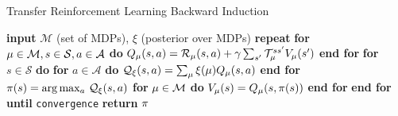 \iffalse
\begin{algorithm}[H]
\caption{Transfer Reinforcement Learning Backward Induction}\label{alg:trl}
\begin{algorithmic}
\State 
{}
\State \hspace{0.5cm}\textbf{input} $\mathcal{M}$ (set of MDPs), $\xi$ (posterior over MDPs)
\State \hspace{0.5cm}\textbf{repeat}
\State \hspace{1.0cm} \textbf{for} $\mu \in \mathcal{M}, s \in \mathcal{S}, a \in \mathcal{A}$ \textbf{do}
\State \hspace{1.5cm} $Q_\mu(s,a) = \mathcal{R}_\mu(s, a) + \gamma \sum_{s'} \mathcal{T}_\mu^{ss'}V_\mu(s')$
\State \hspace{1.0cm} \textbf{end for}
\State \hspace{1.0cm} \textbf{for} $s \in \mathcal{S}$ \textbf{do}
\State \hspace{1.5cm} \textbf{for} $a \in \mathcal{A}$ \textbf{do}
\State \hspace{2.0cm} $\mathcal{Q}_\xi(s, a) = \sum_\mu \xi(\mu)Q_\mu(s, a)$
\State \hspace{1.5cm} \textbf{end for}
\State \hspace{1.5cm} $\pi(s) = \arg\max_a \, \mathcal{Q}_\xi(s,a)$
\State \hspace{1.5cm} \textbf{for} $\mu \in \mathcal{M}$ \textbf{do}
\State \hspace{2.0cm} $V_\mu(s) = Q_\mu(s, \pi(s))$
\State \hspace{1.5cm} \textbf{end for}
\State \hspace{1.0cm} \textbf{end for}
\State \hspace{0.5cm} \textbf{until} \texttt{convergence}
\State \hspace{0.5cm} \textbf{return} $\pi$


\end{algorithmic}
\end{algorithm}
